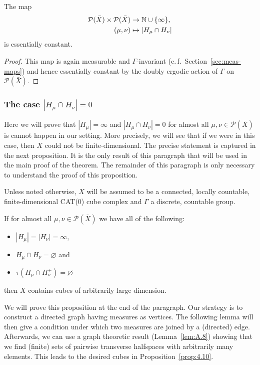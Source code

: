 \begin{lemma}
  \label{lem:hh-const}
  The map
  \begin{align*}
    \mathcal{P}(\bar X) \times \mathcal{P}(\bar X) &\to \mathbb{N} \cup \{\infty\},\\
    (\mu, \nu) &\mapsto |H_\mu \cap H_\nu|
  \end{align*}
  is essentially constant.
\end{lemma}

\begin{proof}
  This map is again measurable and \(\Gamma\)-invariant (c.\,f.~Section~\ref{sec:meas-maps}) and hence essentially constant by the doubly ergodic action of \(\Gamma\) on \(\mathcal{P}(\bar X)\).
\end{proof}

\subsubsection{The case \(|H_\mu \cap H_\nu| = 0\)}
\label{sec:M=0}

Here we will prove that \(|H_\mu| = \infty\) and \(|H_\mu \cap H_\nu| = 0\) for almost all \(\mu, \nu \in \mathcal{P}(\bar X)\) is cannot happen in our setting. More precisely, we will see that if we were in this case, then \(X\) could not be finite-dimensional. The precise statement is captured in the next proposition. It is the only result of this paragraph that will be used in the main proof of the theorem. The remainder of this paragraph is only necessary to understand the proof of this proposition.

Unless noted otherwise, \(X\) will be assumed to be a connected, locally countable, finite-dimensional CAT(0) cube complex and \(\Gamma\) a discrete, countable group.

\begin{prop}[{\cite[Proposition~4.10]{MR3509968}}]
  \label{prop:4.10}
  If for almost all \(\mu, \nu \in \mathcal{P}(\bar X)\) we have all of the following:
  \begin{itemize}
  \item \(|H_\mu| = |H_\nu| = \infty\),
  \item \(H_\mu \cap H_\nu = \varnothing\) and
  \item \(\tau(H_\mu \cap H_\nu^+) = \varnothing\)
  \end{itemize}
  then \(X\) contains cubes of arbitrarily large dimension.
\end{prop}

We will prove this proposition at the end of the paragraph. Our strategy is to construct a directed graph having measures as vertices. The following lemma will then give a condition under which two measures are joined by a (directed) edge. Afterwards, we can use a graph theoretic result (Lemma~\ref{lem:A.8}) showing that we find (finite) sets of pairwise transverse halfspaces with arbitrarily many elements. This leads to the desired cubes in Proposition~\ref{prop:4.10}.


